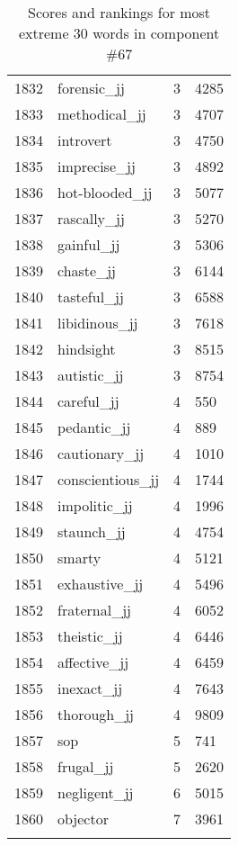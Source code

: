 \begin{longtable}[!htbp]{| rlr@{.}l |}
    1832 & forensic\_jj & 3 & 4285 \\
    1833 & methodical\_jj & 3 & 4707 \\
    1834 & introvert & 3 & 4750 \\
    1835 & imprecise\_jj & 3 & 4892 \\
    1836 & hot-blooded\_jj & 3 & 5077 \\
    1837 & rascally\_jj & 3 & 5270 \\
    1838 & gainful\_jj & 3 & 5306 \\
    1839 & chaste\_jj & 3 & 6144 \\
    1840 & tasteful\_jj & 3 & 6588 \\
    1841 & libidinous\_jj & 3 & 7618 \\
    1842 & hindsight & 3 & 8515 \\
    1843 & autistic\_jj & 3 & 8754 \\
    1844 & careful\_jj & 4 & 550 \\
    1845 & pedantic\_jj & 4 & 889 \\
    1846 & cautionary\_jj & 4 & 1010 \\
    1847 & conscientious\_jj & 4 & 1744 \\
    1848 & impolitic\_jj & 4 & 1996 \\
    1849 & staunch\_jj & 4 & 4754 \\
    1850 & smarty & 4 & 5121 \\
    1851 & exhaustive\_jj & 4 & 5496 \\
    1852 & fraternal\_jj & 4 & 6052 \\
    1853 & theistic\_jj & 4 & 6446 \\
    1854 & affective\_jj & 4 & 6459 \\
    1855 & inexact\_jj & 4 & 7643 \\
    1856 & thorough\_jj & 4 & 9809 \\
    1857 & sop & 5 & 741 \\
    1858 & frugal\_jj & 5 & 2620 \\
    1859 & negligent\_jj & 6 & 5015 \\
    1860 & objector & 7 & 3961 \\
    \hline
    \caption{Scores and rankings for most extreme 30 words in component \#67} \\
\end{longtable}
